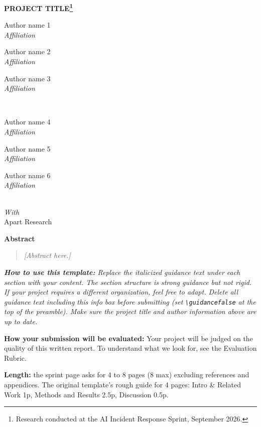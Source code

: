 \documentclass[11pt,a4paper]{article}   %
\newif\ifguidance
\newcommand{\guide}[1]{\ifguidance\textcolor{guidegray}{\itshape #1}\par\medskip\fi}
\newenvironment{guidancebox}
    {\begin{lrbox}{\gbox}\begin{minipage}{0.88\textwidth}%
     \small\color{guidegray}\itshape}
    {\end{minipage}\end{lrbox}%
     \begin{center}\setlength{\fboxsep}{10pt}%
     \fcolorbox{guidegray}{gray!6}{\usebox{\gbox}}\end{center}\medskip}
\newcommand{\authorentry}[2]{%
  \begin{minipage}[t]{0.30\linewidth}\centering
    #1\\[2pt]{\small\itshape #2}
  \end{minipage}\hspace{0.01\linewidth}}
\begin{document}
\begin{center}
  {\LARGE\bfseries PROJECT TITLE\footnote{Research conducted at the AI Incident
   Response Sprint, September 2026.}}\\[1.5em]

  \authorentry{Author name 1}{Affiliation}
  \authorentry{Author name 2}{Affiliation}
  \authorentry{Author name 3}{Affiliation}\\[1.2em]
  \authorentry{Author name 4}{Affiliation}
  \authorentry{Author name 5}{Affiliation}
  \authorentry{Author name 6}{Affiliation}\\[1.5em]

  {\itshape With}\\[2pt]
  Apart Research
\end{center}

\vspace{1em}

\begin{center}\textbf{Abstract}\end{center}
\begin{quote}
\guide{Summarize your project in 150--250 words. A strong abstract lets a reviewer
understand what you did and why it matters without reading anything else. Make sure
to cover: the problem, your approach, key results, and the main takeaway. Polish it
last: the abstract should reflect your final results, not your initial plan.}
\ifguidance\else\textit{[Abstract here.]}\fi
\end{quote}

\vspace{0.5em}

\begin{guidancebox}
\textbf{How to use this template:} Replace the italicized guidance text under each
section with your content. The section structure is strong guidance but not rigid.
If your project requires a different organization, feel free to adapt. Delete all
guidance text including this info box before submitting (set
\texttt{\textbackslash guidancefalse} at the top of the preamble). Make sure the
project title and author information above are up to date.

\medskip
\textbf{How your submission will be evaluated:} Your project will be judged on the
quality of this written report. To understand what we look for, see the Evaluation
Rubric.

\medskip
\textbf{Length:} the sprint page asks for 4 to 8 pages (8 max) excluding
references and appendices. The original template's rough guide for 4 pages:
Intro \& Related Work 1p, Methods and Results 2.5p, Discussion 0.5p.
\end{guidancebox}
\end{document}
